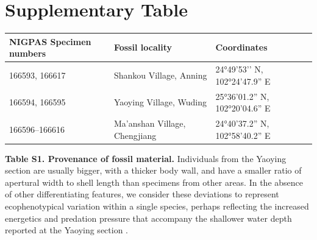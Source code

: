 \documentclass[openany]{book}
\begin{document}
\clearpage

\hypertarget{table}{\chapter*{Supplementary Table}\label{table}}

\begin{tabular}{l|l|l}
\hline
NIGPAS Specimen numbers & Fossil locality & Coordinates\\
\hline
166593, 166617 & Shankou Village, Anning & 24°49’53’’ N, 102°24’47.9” E\\
\hline
166594, 166595 & Yaoying Village, Wuding & 25°36’01.2” N, 102°20’04.6” E\\
\hline
166596--166616 & Ma'anshan Village, Chengjiang & 24°40’37.2” N, 102°58’40.2” E\\
\hline
\end{tabular}

\textbf{Table S1. Provenance of fossil material.} Individuals from the
Yaoying section are usually bigger, with a thicker body wall, and have a
smaller ratio of apertural width to shell length than specimens from
other areas. In the absence of other differentiating features, we
consider these deviations to represent ecophenotypical variation within
a single species, perhaps reflecting the increased energetics and
predation pressure that accompany the shallower water depth reported at
the Yaoying section \citep{Zhao2012}.

\clearpage


\end{document}
